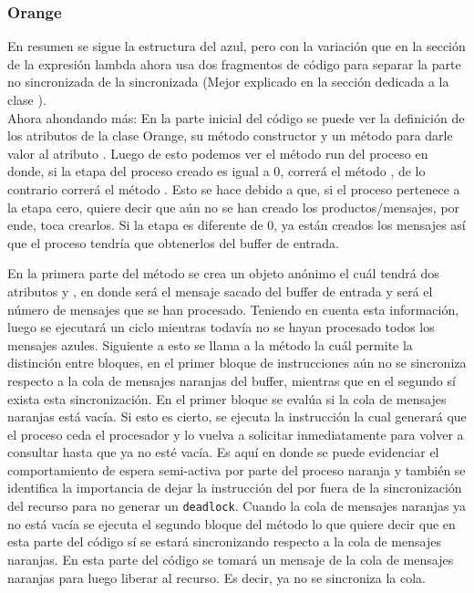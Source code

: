 \documentclass[a4paper]{article}
\begin{document}
    \subsubsection{Orange}
    En resumen se sigue la estructura del azul, pero con la variaci\'on que en la secci\'on de la expresi\'on lambda ahora usa dos fragmentos de c\'odigo para separar la parte no sincronizada de la sincronizada (Mejor explicado en la secci\'on dedicada a la clase ).\\
    Ahora ahondando m\'as: En la parte inicial del c\'odigo se puede ver la definici\'on de los atributos de la clase Orange, su m\'etodo constructor y un m\'etodo para darle valor al atributo .
    Luego de esto podemos ver el m\'etodo run del proceso en donde, si la etapa del proceso creado es igual a 0, correr\'a el m\'etodo , de lo contrario correr\'a el m\'etodo . Esto se hace debido a que, si el proceso pertenece a la etapa cero, quiere decir que a\'un no se han creado los productos/mensajes, por ende, toca crearlos. Si la etapa es diferente de 0, ya est\'an creados los mensajes as\'i que el proceso tendr\'ia que obtenerlos del buffer de entrada.

    En la primera parte del m\'etodo  se crea un objeto an\'onimo  el cu\'al tendr\'a dos atributos  y , en donde  ser\'a el mensaje sacado del buffer de entrada y  ser\'a el n\'umero de mensajes que se han procesado.
    Teniendo en cuenta esta informaci\'on, luego se ejecutar\'a un ciclo mientras todav\'ia no se hayan procesado todos los mensajes azules.
    Siguiente a esto se llama a la m\'etodo  la cu\'al permite la distinci\'on entre bloques, en el primer bloque de instrucciones a\'un no se sincroniza respecto a la cola de mensajes naranjas del buffer, mientras que en el segundo s\'i exista esta sincronizaci\'on.
    En el primer bloque se eval\'ua si la cola de mensajes naranjas est\'a vac\'ia.
    Si esto es cierto, se ejecuta la instrucci\'on  la cual generar\'a que el proceso ceda el procesador y lo vuelva a solicitar inmediatamente para volver a consultar hasta que ya no est\'e vac\'ia.
    Es aqu\'i en donde se puede evidenciar el comportamiento de espera semi-activa por parte del proceso naranja y tambi\'en se identifica la importancia de dejar la instrucci\'on del  por fuera de la sincronizaci\'on del recurso para no generar un \texttt{deadlock}.
    Cuando la cola de mensajes naranjas ya no est\'a vac\'ia se ejecuta el segundo bloque del m\'etodo  lo que quiere decir que en esta parte del c\'odigo s\'i se estar\'a sincronizando respecto a la cola de mensajes naranjas.
    En esta parte del c\'odigo se tomar\'a un mensaje de la cola de mensajes naranjas para luego liberar al recurso.
    Es decir, ya no se sincroniza la cola.\\
\end{document}
